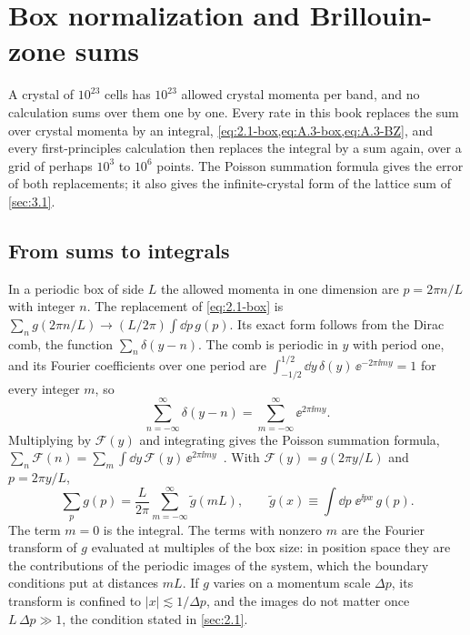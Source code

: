 \section{Box normalization and Brillouin-zone sums}\label{app:C.2}

A crystal of $10^{23}$ cells has $10^{23}$ allowed crystal momenta per band, and no calculation sums over them one by one. Every rate in this book replaces the sum over crystal momenta by an integral, \cref{eq:2.1-box,eq:A.3-box,eq:A.3-BZ}, and every first-principles calculation then replaces the integral by a sum again, over a grid of perhaps $10^3$ to $10^6$ points. The Poisson summation formula gives the error of both replacements; it also gives the infinite-crystal form of the lattice sum of \cref{sec:3.1}.

\subsection{From sums to integrals}

In a periodic box of side $L$ the allowed momenta in one dimension are $p = 2\pi n/L$ with integer $n$. The replacement of \cref{eq:2.1-box} is $\sum_n g(2\pi n/L) \to (L/2\pi)\int\dd p\,g(p)$. Its exact form follows from the Dirac comb, the function $\sum_n\delta(y - n)$. The comb is periodic in $y$ with period one, and its Fourier coefficients over one period are $\int_{-1/2}^{1/2}\dd y\,\delta(y)\,\ee^{-2\pi\ii my} = 1$ for every integer $m$, so
\begin{equation}
  \sum_{n=-\infty}^{\infty}\delta(y - n) = \sum_{m=-\infty}^{\infty}\ee^{2\pi\ii my} .
  \label{eq:C.2-comb}
\end{equation}
Multiplying by $\mathcal{F}(y)$ and integrating gives the Poisson summation formula, $\sum_n\mathcal{F}(n) = \sum_m\int\dd y\,\mathcal{F}(y)\,\ee^{2\pi\ii my}$~\cite[Eq.~(1.8.14)]{olver2010nist}. With $\mathcal{F}(y) = g(2\pi y/L)$ and $p = 2\pi y/L$,
\begin{equation}
  \sum_{p}g(p) = \frac{L}{2\pi}\sum_{m=-\infty}^{\infty}\tilde g(mL), \qquad \tilde g(x) \equiv \int\dd p\;\ee^{\ii px}\,g(p) .
  \label{eq:C.2-poisson}
\end{equation}
The term $m = 0$ is the integral. The terms with nonzero $m$ are the Fourier transform of $g$ evaluated at multiples of the box size: in position space they are the contributions of the periodic images of the system, which the boundary conditions put at distances $mL$. If $g$ varies on a momentum scale $\Delta p$, its transform is confined to $|x| \lesssim 1/\Delta p$, and the images do not matter once $L\,\Delta p \gg 1$, the condition stated in \cref{sec:2.1}.

